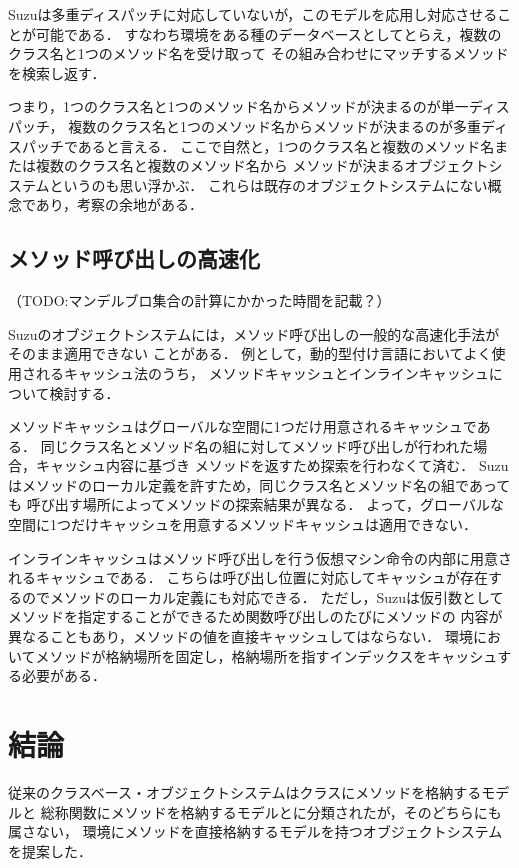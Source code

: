 \documentclass{ipsjprosym}
\begin{document}
Suzuは多重ディスパッチに対応していないが，このモデルを応用し対応させることが可能である．
すなわち環境をある種のデータベースとしてとらえ，複数のクラス名と1つのメソッド名を受け取って
その組み合わせにマッチするメソッドを検索し返す．

つまり，1つのクラス名と1つのメソッド名からメソッドが決まるのが単一ディスパッチ，
複数のクラス名と1つのメソッド名からメソッドが決まるのが多重ディスパッチであると言える．
ここで自然と，1つのクラス名と複数のメソッド名または複数のクラス名と複数のメソッド名から
メソッドが決まるオブジェクトシステムというのも思い浮かぶ．
これらは既存のオブジェクトシステムにない概念であり，考察の余地がある．

\subsection{メソッド呼び出しの高速化}

（TODO:マンデルブロ集合の計算にかかった時間を記載？）

Suzuのオブジェクトシステムには，メソッド呼び出しの一般的な高速化手法がそのまま適用できない
ことがある．
例として，動的型付け言語においてよく使用されるキャッシュ法\cite{Onodera:1997}のうち，
メソッドキャッシュとインラインキャッシュについて検討する．

メソッドキャッシュはグローバルな空間に1つだけ用意されるキャッシュである．
同じクラス名とメソッド名の組に対してメソッド呼び出しが行われた場合，キャッシュ内容に基づき
メソッドを返すため探索を行わなくて済む．
Suzuはメソッドのローカル定義を許すため，同じクラス名とメソッド名の組であっても
呼び出す場所によってメソッドの探索結果が異なる．
よって，グローバルな空間に1つだけキャッシュを用意するメソッドキャッシュは適用できない．

インラインキャッシュはメソッド呼び出しを行う仮想マシン命令の内部に用意されるキャッシュである．
こちらは呼び出し位置に対応してキャッシュが存在するのでメソッドのローカル定義にも対応できる．
ただし，Suzuは仮引数としてメソッドを指定することができるため関数呼び出しのたびにメソッドの
内容が異なることもあり，メソッドの値を直接キャッシュしてはならない．
環境においてメソッドが格納場所を固定し，格納場所を指すインデックスをキャッシュする必要がある．

\section{結論}

従来のクラスベース・オブジェクトシステムはクラスにメソッドを格納するモデルと
総称関数にメソッドを格納するモデルとに分類されたが，そのどちらにも属さない，
環境にメソッドを直接格納するモデルを持つオブジェクトシステムを提案した．
\end{document}
